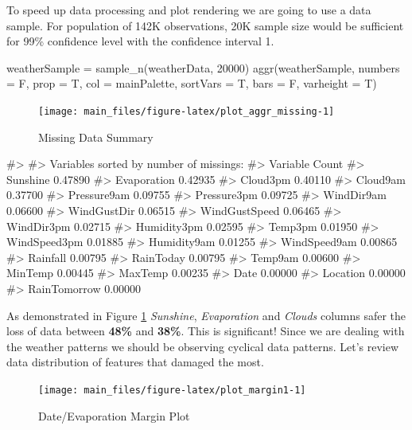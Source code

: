 To speed up data processing and plot rendering we are going to use a
data sample. For population of 142K observations, 20K sample size would
be sufficient for 99\% confidence level with the confidence interval 1.

\begin{Schunk}
\begin{Sinput}
weatherSample = sample_n(weatherData, 20000)
aggr(weatherSample, numbers = F, prop = T, col = mainPalette, sortVars = T, bars = F, varheight = T)
\end{Sinput}
\begin{figure}[H]

{\centering \texttt{[image: main\_files/figure-latex/plot\_aggr\_missing-1]} 

}

\caption[Missing Data Summary]{Missing Data Summary}\label{fig:plot_aggr_missing}
\end{figure}
\begin{Soutput}
#> 
#>  Variables sorted by number of missings: 
#>       Variable   Count
#>       Sunshine 0.47890
#>    Evaporation 0.42935
#>       Cloud3pm 0.40110
#>       Cloud9am 0.37700
#>    Pressure9am 0.09755
#>    Pressure3pm 0.09725
#>     WindDir9am 0.06600
#>    WindGustDir 0.06515
#>  WindGustSpeed 0.06465
#>     WindDir3pm 0.02715
#>    Humidity3pm 0.02595
#>        Temp3pm 0.01950
#>   WindSpeed3pm 0.01885
#>    Humidity9am 0.01255
#>   WindSpeed9am 0.00865
#>       Rainfall 0.00795
#>      RainToday 0.00795
#>        Temp9am 0.00600
#>        MinTemp 0.00445
#>        MaxTemp 0.00235
#>           Date 0.00000
#>       Location 0.00000
#>   RainTomorrow 0.00000
\end{Soutput}
\end{Schunk}

As demonstrated in Figure \ref{fig:plot_aggr_missing} \emph{Sunshine},
\emph{Evaporation} and \emph{Clouds} columns safer the loss of data
between \textbf{48\%} and \textbf{38\%}. This is significant! Since we
are dealing with the weather patterns we should be observing cyclical
data patterns. Let's review data distribution of features that damaged
the most.

\begin{Schunk}
\begin{figure}[H]

{\centering \texttt{[image: main\_files/figure-latex/plot\_margin1-1]} 

}

\caption[Date/Evaporation Margin Plot]{Date/Evaporation Margin Plot}\label{fig:plot_margin1}
\end{figure}
\end{Schunk}

